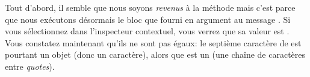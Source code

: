 \documentclass[a4paper,10pt,twoside]{book}
\begin{document}
Tout d'abord, il semble que nous soyons \emph{revenus} à la méthode 
 mais c'est parce que nous exécutons désormais le bloc
que  fourni en argument au message .
Si vous sélectionnez  dans l'inspecteur contextuel, 
vous verrez que sa valeur est .
Vous constatez maintenant qu'ils ne sont pas égaux: le septième caractère
de  est pourtant un objet  (donc un caractère), 
alors que  est un  (\ie une chaîne de caractères entre \emph{quotes}).
\end{document}
